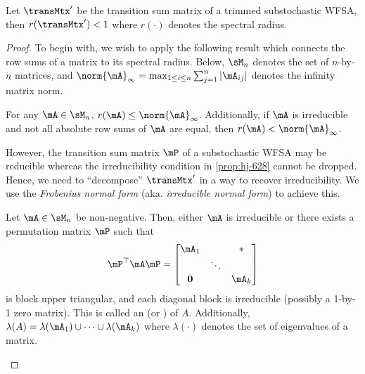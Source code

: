 \begin{lemma}\label{lem:sub-fslm-eigen}
Let $\transMtx'$ be the transition sum matrix of a trimmed substochastic WFSA, then $r(\transMtx')<1$ where $r(\cdot)$ denotes the spectral radius.
\end{lemma}
\begin{proof}
To begin with, we wish to apply the following result which connects the row sums of a matrix to its spectral radius. Below, $\sM_n$ denotes the set of $n$-by-$n$ matrices, and $\norm{\mA}_\infty=\max_{1\leq i \leq n} \sum_{j=1}^n |\mA_{ij}|$ denotes the infinity matrix norm.

\begin{proposition} \label{prop:hj-628}
    For any $\mA\in \sM_n$, $r(\mA)\leq \norm{\mA}_\infty$. Additionally, if $\mA$ is irreducible and not all absolute row sums of $\mA$ are equal, then $r(\mA)<\norm{\mA}_\infty$.
\end{proposition}
However, the transition sum matrix $\mP$ of a substochastic WFSA may be reducible whereas the irreducibility condition in \cref{prop:hj-628} cannot be dropped. Hence, we need to ``decompose'' $\transMtx'$ in a way to recover irreducibility. We use the \emph{Frobenius normal form} (aka. \emph{irreducible normal form}) to achieve this.
\begin{proposition} \label{prop:hj838}
        Let $\mA\in \sM_n$ be non-negative. Then, either $\mA$ is irreducible or there exists a permutation matrix $\mP$ such that
        \begin{align}
        \mP^\top \mA \mP =
        \begin{bmatrix}
            \mA_1 & & \ast \\
                & \ddots & \\
            \mathbf{0} & & \mA_k
        \end{bmatrix}
        \end{align}
        is block upper triangular, and each diagonal block is irreducible (possibly a 1-by-1 zero matrix). This is called an  (or ) of $A$. Additionally, $\lambda(A)=\lambda(\mA_1)\cup\dotsm\cup\lambda(\mA_k)$ where $\lambda(\cdot)$ denotes the set of eigenvalues of a matrix.
\end{proposition}


\end{proof}
